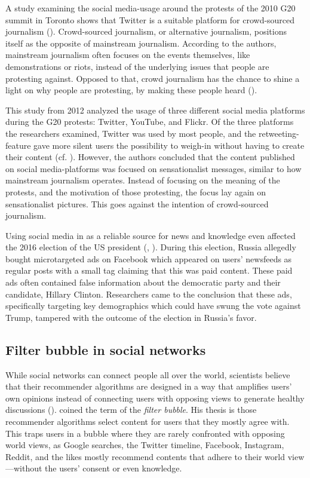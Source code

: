 A study examining the social media-usage around the protests of the 2010 G20 summit in Toronto shows that Twitter is a suitable platform for crowd-sourced journalism (\cite{poell2012twitter}). Crowd-sourced journalism, or alternative journalism, positions itself as the opposite of mainstream journalism. According to the authors, mainstream journalism often focuses on the events themselves, like demonstrations or riots, instead of the underlying issues that people are protesting against. Opposed to that, crowd journalism has the chance to shine a light on why people are protesting, by making these people heard (\cite[698]{poell2012twitter}). 

This study from 2012 analyzed the usage of three different social media platforms during the G20 protests: Twitter, YouTube, and Flickr. Of the three platforms the researchers examined, Twitter was used by most people, and the retweeting-feature gave more silent users the possibility to weigh-in without having to create their content (cf. \cite[709]{poell2012twitter}). However, the authors concluded that the content published on social media-platforms was focused on sensationalist messages, similar to how mainstream journalism operates. Instead of focusing on the meaning of the protests, and the motivation of those protesting, the focus lay again on sensationalist pictures. This goes against the intention of crowd-sourced journalism.

Using social media in as a reliable source for news and knowledge even affected the 2016 election of the US president (\cite{duttSenatorWeSell2018}, \cite{ribeiroMicrotargetingSociallyDivisive2019}). During this election, Russia allegedly bought microtargeted ads on Facebook which appeared on users' newsfeeds as regular posts with a small tag claiming that this was paid content. These paid ads often contained false information about the democratic party and their candidate, Hillary Clinton. Researchers came to the conclusion that these ads, specifically targeting key demographics which could have swung the vote against Trump, tampered with the outcome of the election in Russia's favor.

\subsection{Filter bubble in social networks}
While social networks can connect people all over the world, scientists believe that their recommender algorithms are designed in a way that amplifies users' own opinions instead of connecting users with opposing views to generate healthy discussions (\cite{pariser2011filter}). \citeauthor{pariser2011filter} coined the term of the \emph{filter bubble}. His thesis is those recommender algorithms select content for users that they mostly agree with. This traps users in a bubble where they are rarely confronted with opposing world views, as Google searches, the Twitter timeline, Facebook, Instagram, Reddit, and the likes mostly recommend contents that adhere to their world view---without the users' consent or even knowledge.

